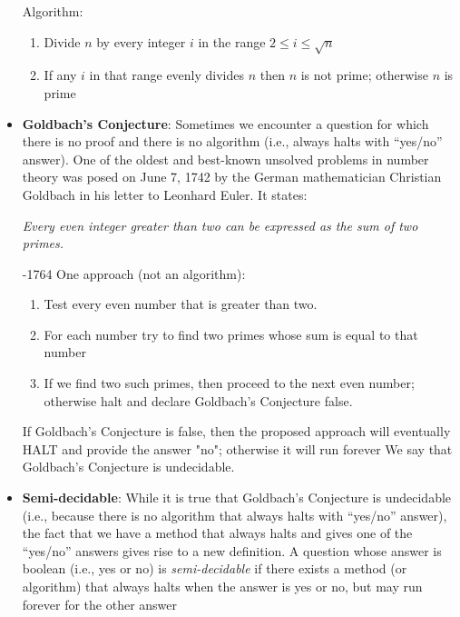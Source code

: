 \documentclass{report}
\begin{document}
\begin{itemize}
            \bigbreak \noindent 
            Algorithm:
            \begin{enumerate}
                \item Divide $n$ by every integer $i$ in the range $2 \leq i \leq \sqrt{n}$
                \item If any $i$ in that range evenly divides $n$ then $n$ is not prime; otherwise $n$ is prime
            \end{enumerate}
        \item \textbf{Goldbach’s Conjecture}: Sometimes we encounter a question for which there is no proof and there is no algorithm (i.e., always halts with “yes/no” answer).
            \bigbreak \noindent 
            One of the oldest and best-known unsolved problems in number theory was posed on June 7, 1742 by the German mathematician Christian Goldbach in his letter to Leonhard Euler. It states:
            \bigbreak \noindent 
            \begin{center}
                \textit{Every even integer greater than two can be expressed as the sum of two primes.}
            \end{center}
            \bigbreak {}-1764 One approach (not an algorithm):
            \begin{enumerate}
                \item Test every even number that is greater than two.
                \item For each number try to find two primes whose sum is equal to that number
                \item If we find two such primes, then proceed to the next even number; otherwise halt and declare Goldbach’s Conjecture false. 
            \end{enumerate}
            \bigbreak \noindent 
            If Goldbach’s Conjecture is false, then the proposed approach will eventually HALT and provide the answer "no"; otherwise it will run forever
            \bigbreak \noindent 
            We say that Goldbach’s Conjecture is undecidable.
        \item \textbf{Semi-decidable}: While it is true that Goldbach’s Conjecture is undecidable (i.e., because there is no algorithm that always halts with “yes/no” answer), the fact that we have a method that always halts and gives one of the “yes/no” answers gives rise to a new definition.
            \bigbreak \noindent 
            A question whose answer is boolean (i.e., yes or no) is \textit{semi-decidable} if there exists a method (or algorithm) that always halts when the answer is yes or no, but may run forever for the other answer

\end{itemize}
\end{document}
